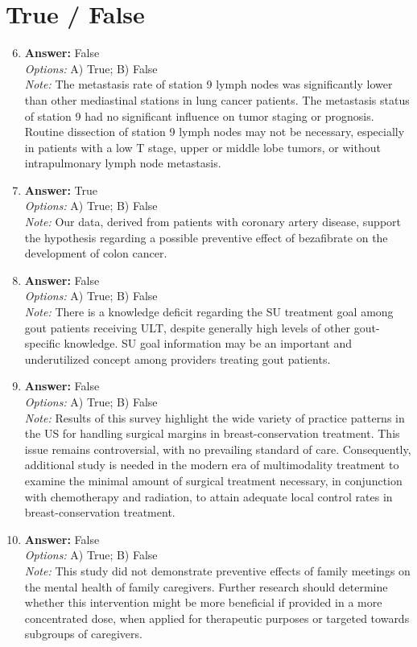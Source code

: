 \documentclass[12pt]{article}
\begin{document}
\section*{True / False}
\begin{enumerate}[label=\arabic*.]
\setcounter{enumi}{5}
\item \textbf{Answer:} False
\\ \textit{Options:} A) True; B) False
\\ \textit{Note:} The metastasis rate of station 9 lymph nodes was significantly lower than other mediastinal stations in lung cancer patients. The metastasis status of station 9 had no significant influence on tumor staging or prognosis. Routine dissection of station 9 lymph nodes may not be necessary, especially in patients with a low T stage, upper or middle lobe tumors, or without intrapulmonary lymph node metastasis.
\item \textbf{Answer:} True
\\ \textit{Options:} A) True; B) False
\\ \textit{Note:} Our data, derived from patients with coronary artery disease, support the hypothesis regarding a possible preventive effect of bezafibrate on the development of colon cancer.
\item \textbf{Answer:} False
\\ \textit{Options:} A) True; B) False
\\ \textit{Note:} There is a knowledge deficit regarding the SU treatment goal among gout patients receiving ULT, despite generally high levels of other gout-specific knowledge. SU goal information may be an important and underutilized concept among providers treating gout patients.
\item \textbf{Answer:} False
\\ \textit{Options:} A) True; B) False
\\ \textit{Note:} Results of this survey highlight the wide variety of practice patterns in the US for handling surgical margins in breast-conservation treatment. This issue remains controversial, with no prevailing standard of care. Consequently, additional study is needed in the modern era of multimodality treatment to examine the minimal amount of surgical treatment necessary, in conjunction with chemotherapy and radiation, to attain adequate local control rates in breast-conservation treatment.
\item \textbf{Answer:} False
\\ \textit{Options:} A) True; B) False
\\ \textit{Note:} This study did not demonstrate preventive effects of family meetings on the mental health of family caregivers. Further research should determine whether this intervention might be more beneficial if provided in a more concentrated dose, when applied for therapeutic purposes or targeted towards subgroups of caregivers.
\end{enumerate}
\end{document}
